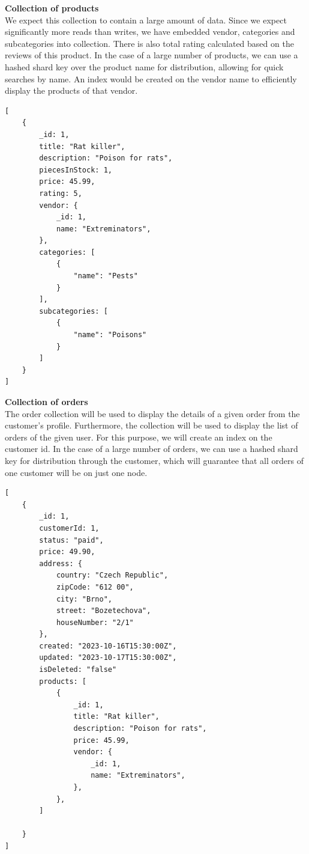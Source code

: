 \documentclass[12pt,english]{article}
\begin{document}
\noindent\textbf{Collection of products}\\
We expect this collection to contain a large amount of data. Since we expect significantly more reads than writes, we have embedded vendor, categories and subcategories into collection. There is also total rating calculated based on the reviews of this product. In the case of a large number of products, we can use a hashed shard key over the product name for distribution, allowing for quick searches by name. An index would be created on the vendor name to efficiently display the products of that vendor.
\begin{lstlisting}[style=jsonstyle]
[
    {
        _id: 1,
        title: "Rat killer",
        description: "Poison for rats",
        piecesInStock: 1,
        price: 45.99,
        rating: 5,
        vendor: {
            _id: 1,
            name: "Extreminators",
        },
        categories: [
            {
                "name": "Pests"
            }
        ],
        subcategories: [
            {
                "name": "Poisons"
            }
        ]
    }
]
\end{lstlisting}

\newpage
\noindent\textbf{Collection of orders}\\
The order collection will be used to display the details of a given order from the customer's profile. Furthermore, the collection will be used to display the list of orders of the given user. For this purpose, we will create an index on the customer id. In the case of a large number of orders, we can use a hashed shard key for distribution through the customer, which will guarantee that all orders of one customer will be on just one node.
\begin{lstlisting}[style=jsonstyle]
[
    {
        _id: 1,
        customerId: 1,
        status: "paid",
        price: 49.90,
        address: {
            country: "Czech Republic",
            zipCode: "612 00",
            city: "Brno",
            street: "Bozetechova",
            houseNumber: "2/1"
        },
        created: "2023-10-16T15:30:00Z",
        updated: "2023-10-17T15:30:00Z",
        isDeleted: "false"
        products: [
            {
                _id: 1,
                title: "Rat killer",
                description: "Poison for rats",
                price: 45.99,
                vendor: {
                    _id: 1,
                    name: "Extreminators",
                },
            },  
        ]
        
    }
]
\end{lstlisting}
\end{document}
